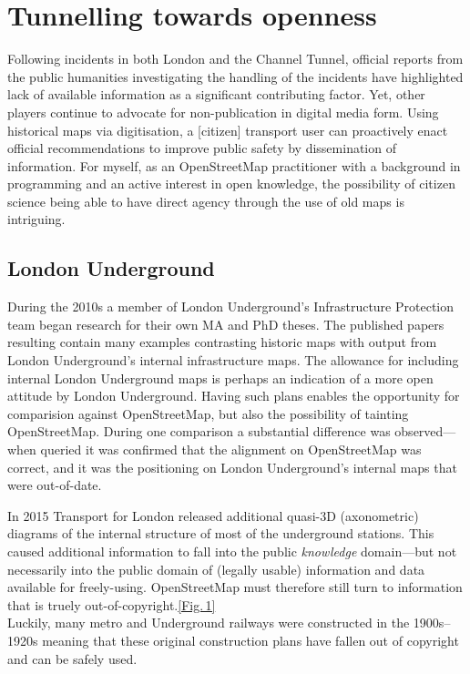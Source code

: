 \documentclass[conference,a4paper]{IEEEtran}
\begin{document}
\section{Tunnelling towards openness}

Following incidents in both London and the Channel Tunnel, official
reports from the public humanities investigating the handling of the
incidents have highlighted lack of available information as a
significant contributing factor.\cite{riab-2010}\cite{riab-2013} Yet,
other players continue to advocate for non-publication in digital
media form.\cite{foi-2011} Using historical maps via digitisation, a
[citizen] transport user can proactively enact official
recommendations to improve public safety by dissemination of
information. For myself, as an OpenStreetMap
practitioner with a background in programming and an active interest
in open knowledge, the possibility of citizen science being able to
have direct agency through the use of old maps is intriguing.

\subsection{London Underground}\vspace{-0.2em}

During the 2010s a member of London Underground's Infrastructure
Protection team began research for their own MA and PhD theses.  The
published papers resulting contain many examples contrasting historic
maps with output from London Underground's internal infrastructure
maps.\cite{darroch-2012}\cite{darroch-2014} The allowance for
including internal London Underground maps is perhaps an indication of a
more open attitude by London Underground.  Having such plans enables the opportunity for
comparision against OpenStreetMap, but also the possibility of
tainting OpenStreetMap.  During one comparison a substantial difference was observed---when queried it was confirmed that the
alignment on OpenStreetMap was correct, and it was the positioning
on London Underground's internal maps that were out-of-date.

In 2015 Transport for London released additional quasi-{\small 3D} (axonometric) diagrams of
the internal structure of most of the underground stations.\cite{foi-2015}
This caused additional information to fall into the public {\it knowledge}
domain---but not necessarily into the public domain of (legally usable) information and
data available for freely-using.  OpenStreetMap must therefore still
turn to information that is truely out-of-copyright.\hfill{}\hyperref[fig:south-ken-bends]{[Fig.\,1]}\\
Luckily, many metro and Underground railways were constructed in the
1900s--1920s meaning that these original construction plans have
fallen out of copyright and can be safely used.
\end{document}
